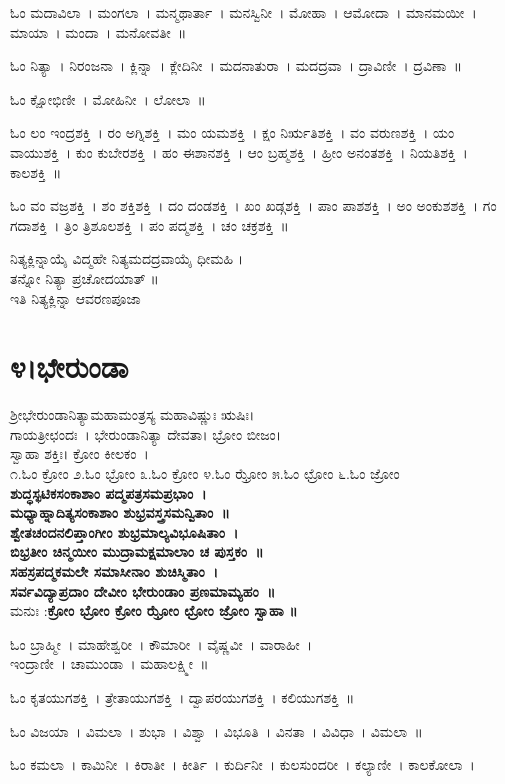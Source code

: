 ಓಂ ಮದಾವಿಲಾ~।  ಮಂಗಲಾ~।  ಮನ್ಮಥಾರ್ತಾ~।  ಮನಸ್ವಿನೀ~।  ಮೋಹಾ~।  ಆಮೋದಾ~।  ಮಾನಮಯೀ~।  ಮಾಯಾ~।  ಮಂದಾ~।  ಮನೋವತೀ~॥ 

ಓಂ ನಿತ್ಯಾ~।  ನಿರಂಜನಾ~।  ಕ್ಲಿನ್ನಾ~।  ಕ್ಲೇದಿನೀ~।  ಮದನಾತುರಾ~।  ಮದದ್ರವಾ~।  ದ್ರಾವಿಣೀ~।  ದ್ರವಿಣಾ~॥ 

ಓಂ ಕ್ಷೋಭಿಣೀ~।  ಮೋಹಿನೀ~।  ಲೋಲಾ~॥

ಓಂ ಲಂ ಇಂದ್ರಶಕ್ತಿ~।  ರಂ ಅಗ್ನಿಶಕ್ತಿ~।  ಮಂ ಯಮಶಕ್ತಿ~।  ಕ್ಷಂ ನಿರ್ಋತಿಶಕ್ತಿ~।  ವಂ ವರುಣಶಕ್ತಿ~।  ಯಂ ವಾಯುಶಕ್ತಿ~।  ಕುಂ ಕುಬೇರಶಕ್ತಿ~।  ಹಂ ಈಶಾನಶಕ್ತಿ~।  ಆಂ ಬ್ರಹ್ಮಶಕ್ತಿ~।  ಹ್ರೀಂ ಅನಂತಶಕ್ತಿ~।  ನಿಯತಿಶಕ್ತಿ~।  ಕಾಲಶಕ್ತಿ~॥ 

ಓಂ ವಂ ವಜ್ರಶಕ್ತಿ~।  ಶಂ ಶಕ್ತಿಶಕ್ತಿ~।  ದಂ ದಂಡಶಕ್ತಿ~।  ಖಂ ಖಡ್ಗಶಕ್ತಿ~।  ಪಾಂ ಪಾಶಶಕ್ತಿ~।  ಅಂ ಅಂಕುಶಶಕ್ತಿ~।  ಗಂ ಗದಾಶಕ್ತಿ~।  ತ್ರಿಂ ತ್ರಿಶೂಲಶಕ್ತಿ~।  ಪಂ ಪದ್ಮಶಕ್ತಿ~।  ಚಂ ಚಕ್ರಶಕ್ತಿ~॥ 

ನಿತ್ಯಕ್ಲಿನ್ನಾಯೈ ವಿದ್ಮಹೇ ನಿತ್ಯಮದದ್ರವಾಯೈ ಧೀಮಹಿ ।\\ತನ್ನೋ ನಿತ್ಯಾ ಪ್ರಚೋದಯಾತ್ ॥\\
ಇತಿ ನಿತ್ಯಕ್ಲಿನ್ನಾ ಆವರಣಪೂಜಾ
\section{೪।ಭೇರುಂಡಾ}
ಶ್ರೀಭೇರುಂಡಾನಿತ್ಯಾಮಹಾಮಂತ್ರಸ್ಯ ಮಹಾವಿಷ್ಣುಃ ಋಷಿಃ। \\ಗಾಯತ್ರೀಛಂದಃ~। ಭೇರುಂಡಾನಿತ್ಯಾ ದೇವತಾ। ಭ್ರೋಂ ಬೀಜಂ।\\ ಸ್ವಾಹಾ ಶಕ್ತಿಃ। ಕ್ರೋಂ ಕೀಲಕಂ~।\\
೧.ಓಂ ಕ್ರೋಂ  ೨.ಓಂ ಭ್ರೋಂ ೩.ಓಂ ಕ್ರೋಂ  ೪.ಓಂ ಝ್ರೋಂ ೫.ಓಂ ಛ್ರೋಂ  ೬.ಓಂ ಜ್ರೋಂ \\
{\bfseries ಶುದ್ಧಸ್ಫಟಿಕಸಂಕಾಶಾಂ ಪದ್ಮಪತ್ರಸಮಪ್ರಭಾಂ~।\\
ಮಧ್ಯಾಹ್ನಾದಿತ್ಯಸಂಕಾಶಾಂ ಶುಭ್ರವಸ್ತ್ರಸಮನ್ವಿತಾಂ~॥\\
ಶ್ವೇತಚಂದನಲಿಪ್ತಾಂಗೀಂ ಶುಭ್ರಮಾಲ್ಯವಿಭೂಷಿತಾಂ~।\\	
ಬಿಭ್ರತೀಂ ಚಿನ್ಮಯೀಂ ಮುದ್ರಾಮಕ್ಷಮಾಲಾಂ ಚ ಪುಸ್ತಕಂ~॥\\
ಸಹಸ್ರಪದ್ಮಕಮಲೇ ಸಮಾಸೀನಾಂ ಶುಚಿಸ್ಮಿತಾಂ~।\\
ಸರ್ವವಿದ್ಯಾಪ್ರದಾಂ ದೇವೀಂ ಭೇರುಂಡಾಂ ಪ್ರಣಮಾಮ್ಯಹಂ~॥\\}
ಮನುಃ :{\bfseries  ಕ್ರೋಂ ಭ್ರೋಂ ಕ್ರೋಂ ಝ್ರೋಂ ಛ್ರೋಂ ಜ್ರೋಂ ಸ್ವಾಹಾ ॥}

ಓಂ ಬ್ರಾಹ್ಮೀ~।  ಮಾಹೇಶ್ವರೀ~।  ಕೌಮಾರೀ~।  ವೈಷ್ಣವೀ~। ವಾರಾಹೀ~।\\  ಇಂದ್ರಾಣೀ~।  ಚಾಮುಂಡಾ~।  ಮಹಾಲಕ್ಷ್ಮೀ~॥ 

ಓಂ ಕೃತಯುಗಶಕ್ತಿ~।  ತ್ರೇತಾಯುಗಶಕ್ತಿ~।  ದ್ವಾಪರಯುಗಶಕ್ತಿ~।  ಕಲಿಯುಗಶಕ್ತಿ~॥ 

ಓಂ ವಿಜಯಾ~।  ವಿಮಲಾ~।  ಶುಭಾ~।  ವಿಶ್ವಾ~।  ವಿಭೂತಿ~।  ವಿನತಾ~।  ವಿವಿಧಾ~।  ವಿಮಲಾ~॥ 

ಓಂ ಕಮಲಾ~।  ಕಾಮಿನೀ~।  ಕಿರಾತೀ~।  ಕೀರ್ತಿ~।  ಕುರ್ದಿನೀ~।  ಕುಲಸುಂದರೀ~।  ಕಲ್ಯಾಣೀ~।  ಕಾಲಕೋಲಾ~।  

